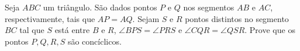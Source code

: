 Seja $ABC$ um triângulo. São dados pontos $P$ e $Q$ nos segmentos $AB$ e $AC$, respectivamente, tais que $AP=AQ$. Sejam $S$ e $R$ pontos distintos no segmento $BC$ tal que $S$ está entre $B$ e $R$, $\angle BPS=\angle PRS$ e $\angle CQR=\angle QSR$. Prove que os pontos $P,Q,R,S$ são concíclicos.
